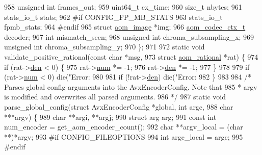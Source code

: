 \begin{DoxyCodeInclude}
{{{{{{{{{958   \textcolor{keywordtype}{unsigned} \textcolor{keywordtype}{int} frames\_out;
959   uint64\_t cx\_time;
960   \textcolor{keywordtype}{size\_t} nbytes;
961   stats\_io\_t stats;
962 \textcolor{preprocessor}{#if CONFIG\_FP\_MB\_STATS}
963   stats\_io\_t fpmb\_stats;
964 \textcolor{preprocessor}{#endif}
965   \textcolor{keyword}{struct }\hyperlink{structaom__image}{aom\_image} *img;
966   \hyperlink{structaom__codec__ctx}{aom\_codec\_ctx\_t} decoder;
967   \textcolor{keywordtype}{int} mismatch\_seen;
968   \textcolor{keywordtype}{unsigned} \textcolor{keywordtype}{int} chroma\_subsampling\_x;
969   \textcolor{keywordtype}{unsigned} \textcolor{keywordtype}{int} chroma\_subsampling\_y;
970 \};
971 
972 \textcolor{keyword}{static} \textcolor{keywordtype}{void} validate\_positive\_rational(\textcolor{keyword}{const} \textcolor{keywordtype}{char} *msg,
973                                        \textcolor{keyword}{struct} \hyperlink{structaom__rational}{aom\_rational} *rat) \{
974   \textcolor{keywordflow}{if} (rat->\hyperlink{structaom__rational_adeddf2ea01c12b7be66536e0a0fb92c5}{den} < 0) \{
975     rat->\hyperlink{structaom__rational_a7b48174411798c780a15f132c4650839}{num} *= -1;
976     rat->\hyperlink{structaom__rational_adeddf2ea01c12b7be66536e0a0fb92c5}{den} *= -1;
977   \}
978 
979   \textcolor{keywordflow}{if} (rat->\hyperlink{structaom__rational_a7b48174411798c780a15f132c4650839}{num} < 0) die(\textcolor{stringliteral}{"Error: %
980 
981   \textcolor{keywordflow}{if} (!rat->\hyperlink{structaom__rational_adeddf2ea01c12b7be66536e0a0fb92c5}{den}) die(\textcolor{stringliteral}{"Error: %
982 \}
983 
984 \textcolor{comment}{/* Parses global config arguments into the AvxEncoderConfig. Note that}
985 \textcolor{comment}{ * argv is modified and overwrites all parsed arguments.}
986 \textcolor{comment}{ */}
987 \textcolor{keyword}{static} \textcolor{keywordtype}{void} parse\_global\_config(\textcolor{keyword}{struct} AvxEncoderConfig *global, \textcolor{keywordtype}{int} argc,
988                                 \textcolor{keywordtype}{char} ***argv) \{
989   \textcolor{keywordtype}{char} **argi, **argj;
990   \textcolor{keyword}{struct }arg arg;
991   \textcolor{keyword}{const} \textcolor{keywordtype}{int} num\_encoder = get\_aom\_encoder\_count();
992   \textcolor{keywordtype}{char} **argv\_local = (\textcolor{keywordtype}{char} **)*argv;
993 \textcolor{preprocessor}{#if CONFIG\_FILEOPTIONS}
994   \textcolor{keywordtype}{int} argc\_local = argc;
995 \textcolor{preprocessor}{#endif}
}}}}}}}}}}}
\end{DoxyCodeInclude}
